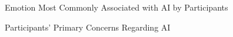 \documentclass[12pt]{article}
\begin{document}
\begin{figure}[bht]
	\begin{center}
	{}
	\end{center}
	\vspace{-5mm} %
\caption{Emotion Most Commonly Associated with AI by Participants}
	\label{emotion}
	\end{figure}

\begin{figure}[bht]
	\begin{center}
	{}
	\end{center}
	\vspace{-5mm} %
\caption{Participants' Primary Concerns Regarding AI}
	\label{concerns}
	\end{figure}
\end{document}
